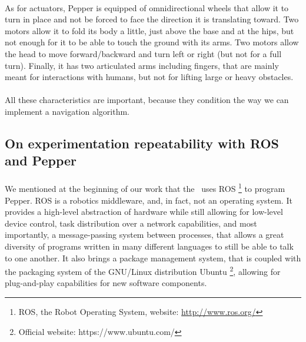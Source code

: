 \paragraph{} As for actuators, Pepper is equipped of omnidirectional wheels that allow it to turn in place and not be forced to face the direction it is translating toward. Two motors allow it to fold its body a little, just above the base and at the hips, but not enough for it to be able to touch the ground with its arms. Two motors allow the head to move forward/backward and turn left or right (but not for a full turn). Finally, it has two articulated arms including fingers, that are mainly meant for interactions with humans, but not for lifting large or heavy obstacles.

\paragraph{} All these characteristics are important, because they condition the way we can implement a navigation algorithm.

\subsection{On experimentation repeatability with ROS and Pepper}

\paragraph{} We mentioned at the beginning of our work that the \groupname \, uses ROS \footnote{ROS, the Robot Operating System, website: \url{http://www.ros.org/}} to program Pepper. ROS is a robotics middleware, and, in fact, not an operating system. It provides a high-level abstraction of hardware while still allowing for low-level device control, task distribution over a network capabilities, and most importantly, a message-passing system between processes, that allows a great diversity of programs written in many different languages to still be able to talk to one another. It also brings a package management system, that is coupled with the packaging system of the GNU/Linux distribution Ubuntu \footnote{Official website: https://www.ubuntu.com/}, allowing for plug-and-play capabilities for new software components.

